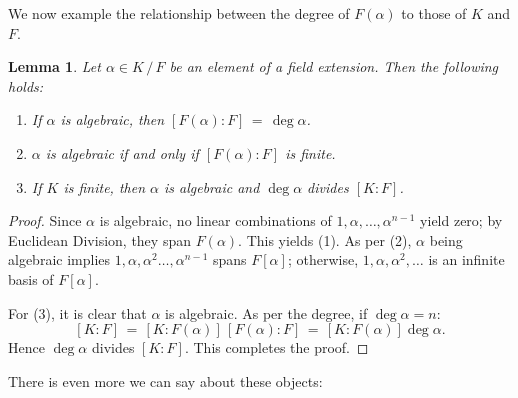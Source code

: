 \documentclass[11pt]{article}
\newtheorem{lemma}{Lemma}
\begin{document}
We now example the relationship between the degree of $F(\alpha)$ to those of $K$ and $F$.

\begin{adjustwidth}{0.5cm}{}
  \begin{lemma}
    Let $\alpha \in K \, / \, F$ be an element of a field extension. Then the following holds:
    \begin{enumerate}
      \item If $\alpha$ is algebraic, then $[F(\alpha) : F] \, = \, \deg \alpha$.
      \item $\alpha$ is algebraic if and only if $[F(\alpha) : F]$ is finite.
      \item If $K$ is finite, then $\alpha$ is algebraic and $\deg \alpha$ divides $[K : F]$.
    \end{enumerate}
  \end{lemma}
  \begin{proof}
    Since $\alpha$ is algebraic, no linear combinations of $1, \alpha, \ldots, \alpha^{n - 1}$ yield zero; by Euclidean Division, they span $F(\alpha)$. This yields (1). As per (2), $\alpha$ being algebraic implies $1, \alpha, \alpha^{2} \ldots, \alpha^{n - 1}$ spans $F[\alpha]$; otherwise, $1, \alpha, \alpha^{2}, \ldots$ is an infinite basis of $F[\alpha]$.

    For (3), it is clear that $\alpha$ is algebraic. As per the degree, if $\deg \alpha = n$:
    \[
      [K : F] \, = \, [K : F(\alpha)] \, [F(\alpha) : F] \, = \, [K : F(\alpha)] \deg \alpha.
    \]
    Hence $\deg \alpha$ divides $[K : F]$. This completes the proof.
  \end{proof}
\end{adjustwidth}

There is even more we can say about these objects:

\newpage
\end{document}
